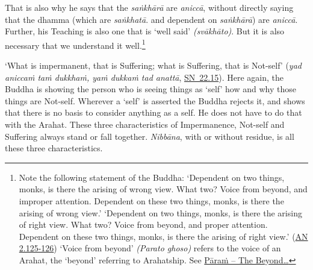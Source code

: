 That is also why he says that the \emph{saṅkhārā} are \emph{aniccā}, without directly saying that the dhamma (which are \emph{saṅkhatā}. and dependent on \emph{saṅkhārā}) are \emph{aniccā}. Further, his Teaching is also one that is `well said' \emph{(svākhāto)}. But it is also necessary that we understand it well.\footnote{Note the following statement of the Buddha: `Dependent on two things, monks, is there the arising of wrong view. What two? Voice from beyond, and improper attention. Dependent on these two things, monks, is there the arising of wrong view.' `Dependent on two things, monks, is there the arising of right view. What two? Voice from beyond, and proper attention. Dependent on these two things, monks, is there the arising of right view.' (\href{https://suttacentral.net/an2.118-129/en/sujato}{AN 2.125-126}) `Voice from beyond' \emph{(Parato ghoso)} refers to the voice of an Arahat, the `beyond' referring to Arahatship. See \protect\hyperlink{beyond}{Pāraṁ -- The Beyond\ldots{}}}

`What is impermanent, that is Suffering; what is Suffering, that is Not-self' (\emph{yad aniccaṁ taṁ dukkhaṁ, yaṁ dukkaṁ tad anattā}, \href{https://suttacentral.net/sn22.15/en/bodhi}{SN~22.15}). Here again, the Buddha is showing the person who is seeing things as `self' how and why those things are Not-self. Wherever a `self' is asserted the Buddha rejects it, and shows that there is no basis to consider anything as a self. He does not have to do that with the Arahat. These three characteristics of Impermanence, Not-self and Suffering always stand or fall together. \emph{Nibbāna}, with or without residue, is  all these three characteristics.
